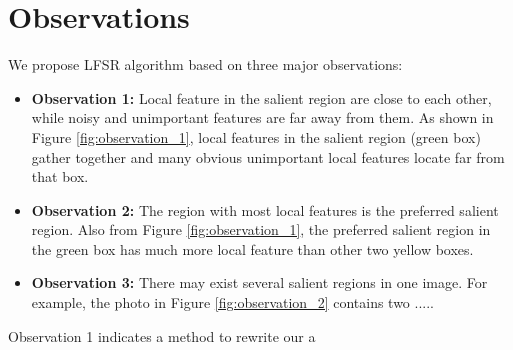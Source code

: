 \section{Observations}

We propose LFSR algorithm based on three major observations:

\begin{itemize}
	
	\item {\bf Observation 1:} Local feature in the salient region are close to each other, while noisy and unimportant features are far away from them. As shown in Figure \ref{fig:observation_1}, local features in the salient region (green box) gather together and many obvious unimportant local features locate far from that box.

	\item {\bf Observation 2:} The region with most local features is the preferred salient region. Also from Figure \ref{fig:observation_1}, the preferred salient region in the green box has much more local feature than other two yellow boxes.

	\item {\bf Observation 3:} There may exist several salient regions in one image. For example, the photo in Figure \ref{fig:observation_2} contains two .....

\end{itemize}

Observation 1 indicates a method to rewrite our a